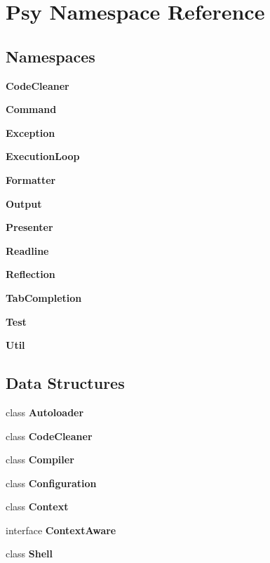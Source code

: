 \section{Psy Namespace Reference}
\label{namespace_psy}
\subsection*{Namespaces}
\begin{DoxyCompactItemize}
\item 
 {\bf Code\+Cleaner}
\item 
 {\bf Command}
\item 
 {\bf Exception}
\item 
 {\bf Execution\+Loop}
\item 
 {\bf Formatter}
\item 
 {\bf Output}
\item 
 {\bf Presenter}
\item 
 {\bf Readline}
\item 
 {\bf Reflection}
\item 
 {\bf Tab\+Completion}
\item 
 {\bf Test}
\item 
 {\bf Util}
\end{DoxyCompactItemize}
\subsection*{Data Structures}
\begin{DoxyCompactItemize}
\item 
class {\bf Autoloader}
\item 
class {\bf Code\+Cleaner}
\item 
class {\bf Compiler}
\item 
class {\bf Configuration}
\item 
class {\bf Context}
\item 
interface {\bf Context\+Aware}
\item 
class {\bf Shell}
\end{DoxyCompactItemize}

